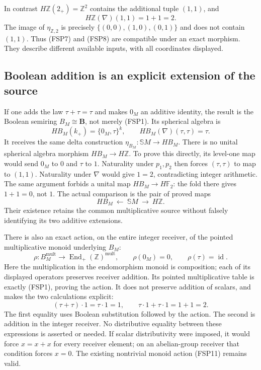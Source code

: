 In contrast $H\mathbb Z(2_+)=\mathbb Z^2$ contains the
additional tuple $(1,1)$, and
\begin{equation}\tag{FSP8}
H\mathbb Z(\nabla)(1,1)=1+1=2.
\end{equation}
The image of $\eta_{\mathbb Z,2}$ is precisely
$\{(0,0),(1,0),(0,1)\}$ and does not contain $(1,1)$.
Thus (FSP7) and (FSP8) are compatible under an exact
morphism. They describe different available inputs,
with all coordinates displayed.

\subsection{Boolean addition is an explicit extension of the source}

If one adds the law
$\tau+\tau=\tau$ and makes
$0_M$ an additive identity, the result is the Boolean
semiring $B_M\cong\mathbf B$, not merely (FSP1).
Its spherical algebra is
\begin{equation}\tag{FSP9}
HB_M(k_+)=\{0_M,\tau\}^k,\qquad
HB_M(\nabla)(\tau,\tau)
   =\tau.
\end{equation}
It receives the same delta construction
$\eta_{B_M}:\mathbb S M\to HB_M$.
There is no unital spherical algebra morphism
$HB_M\to H\mathbb Z$. To prove this directly, its
level-one map would send $0_M$ to $0$ and
$\tau$ to $1$. Naturality under $p_1,p_2$
then forces $(\tau,\tau)$ to map
to $(1,1)$. Naturality under $\nabla$ would give
$1=2$, contradicting integer arithmetic.
The same argument forbids a unital map $HB_M\to H\mathbb F_2$:
the fold there gives $1+1=0$, not $1$.
The actual comparison is the pair of proved maps
\begin{equation}\tag{FSP10}
HB_M\ \longleftarrow\ \mathbb S M\ \longrightarrow\ H\mathbb Z.
\end{equation}
Their existence retains the common multiplicative source
without falsely identifying its two additive extensions.

There is also an exact action, on the entire integer
receiver, of the pointed multiplicative monoid underlying
$B_M$:
\begin{equation}\tag{FSP11}
\rho:B_M^{\mathrm{mult}}\longrightarrow
\operatorname{End}_{+}(\mathbb Z)^{\mathrm{mult}},\qquad
\rho(0_M)=0,\qquad\rho(\tau)=\operatorname{id}.
\end{equation}
Here the multiplication in the endomorphism monoid is
composition; each of its displayed operators preserves
receiver addition. Its pointed multiplicative table is
exactly (FSP1), proving the action. It does not preserve
addition of scalars, and makes the two calculations explicit:
\begin{equation}\tag{FSP12}
(\tau+\tau)\mathbin{\cdot}1
 =\tau\mathbin{\cdot}1=1,
\qquad
\tau\mathbin{\cdot}1+
\tau\mathbin{\cdot}1=1+1=2.
\end{equation}
The first equality uses Boolean substitution followed
by the action. The second is addition in the integer
receiver. No distributive equality between these expressions
is asserted or needed. If scalar distributivity were imposed,
it would force $x=x+x$ for every receiver element; on an
abelian-group receiver that condition forces $x=0$.
The existing nontrivial monoid action (FSP11) remains valid.


